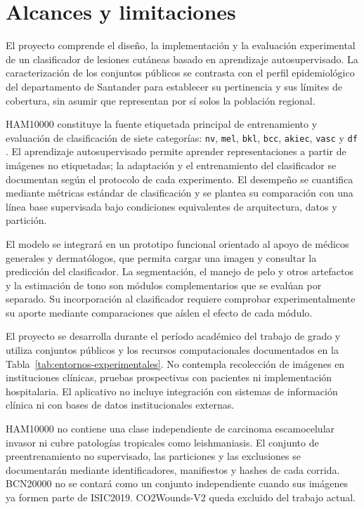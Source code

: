 \chapter{Alcances y limitaciones}\label{sec:alcance-delimitacion}

El proyecto comprende el diseño, la implementación y la evaluación experimental de un clasificador de lesiones cutáneas basado en aprendizaje autosupervisado. La caracterización de los conjuntos públicos se contrasta con el perfil epidemiológico del departamento de Santander para establecer su pertinencia y sus límites de cobertura, sin asumir que representan por sí solos la población regional.

HAM10000 constituye la fuente etiquetada principal de entrenamiento y evaluación de clasificación de siete categorías: \texttt{nv}, \texttt{mel}, \texttt{bkl}, \texttt{bcc}, \texttt{akiec}, \texttt{vasc} y \texttt{df} \parencite{tschandl2018ham10000}. El aprendizaje autosupervisado permite aprender representaciones a partir de imágenes no etiquetadas; la adaptación y el entrenamiento del clasificador se documentan según el protocolo de cada experimento. El desempeño se cuantifica mediante métricas estándar de clasificación y se plantea su comparación con una línea base supervisada bajo condiciones equivalentes de arquitectura, datos y partición.

El modelo se integrará en un prototipo funcional orientado al apoyo de médicos generales y dermatólogos, que permita cargar una imagen y consultar la predicción del clasificador. La segmentación, el manejo de pelo y otros artefactos y la estimación de tono son módulos complementarios que se evalúan por separado. Su incorporación al clasificador requiere comprobar experimentalmente su aporte mediante comparaciones que aíslen el efecto de cada módulo.

El proyecto se desarrolla durante el período académico del trabajo de grado y utiliza conjuntos públicos y los recursos computacionales documentados en la Tabla~\ref{tab:entornos-experimentales}. No contempla recolección de imágenes en instituciones clínicas, pruebas prospectivas con pacientes ni implementación hospitalaria. El aplicativo no incluye integración con sistemas de información clínica ni con bases de datos institucionales externas.

HAM10000 no contiene una clase independiente de carcinoma escamocelular invasor ni cubre patologías tropicales como leishmaniasis. El conjunto de preentrenamiento no supervisado, las particiones y las exclusiones se documentarán mediante identificadores, manifiestos y hashes de cada corrida. BCN20000 no se contará como un conjunto independiente cuando sus imágenes ya formen parte de ISIC2019. CO2Wounds-V2 queda excluido del trabajo actual.

